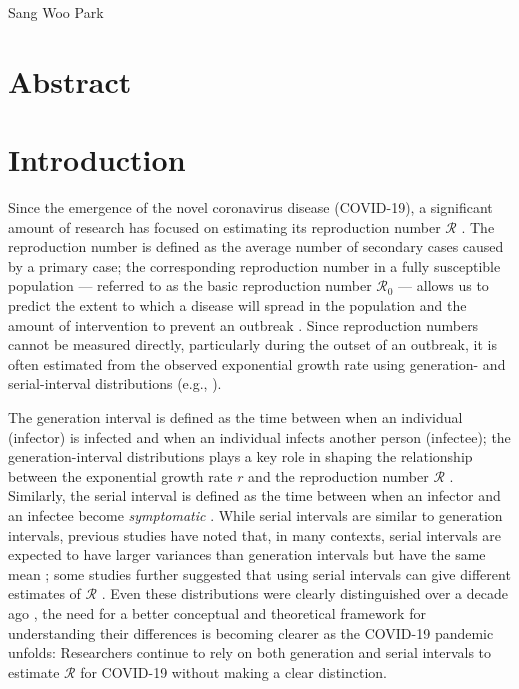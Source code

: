 \documentclass[12pt]{article}
\date{\today}
\begin{document}
\begin{flushleft}{
	\Large
	\textbf{}
}
\newline
Sang Woo Park
\end{flushleft}

\section*{Abstract}

\pagebreak

\section{Introduction}

Since the emergence of the novel coronavirus disease (COVID-19), a significant amount of research has focused on estimating its reproduction number $\mathcal R$ \citep{majumder2020early}.
The reproduction number is defined as the average number of secondary cases caused by a primary case;
the corresponding reproduction number in a fully susceptible population --- referred to as the basic reproduction number $\mathcal R_0$ --- allows us to predict the extent to which a disease will spread in the population and the amount of intervention to prevent an outbreak \citep{anderson1991infectious}.
Since reproduction numbers cannot be measured directly, particularly during the outset of an outbreak, it is often estimated from the observed exponential growth rate using generation- and serial-interval distributions (e.g., \cite{du2020serial, jung2020real, li2020early, zhao2020preliminary}).

The generation interval is defined as the time between when an individual (infector) is infected and when an individual infects another person (infectee);
the generation-interval distributions plays a key role in shaping the relationship between the exponential growth rate $r$ and the reproduction number $\mathcal R$ \citep{wallinga2007generation}.
Similarly, the serial interval is defined as the time between when an infector and an infectee become \emph{symptomatic} \citep{svensson2007note}.
While serial intervals are similar to generation intervals, previous studies have noted that, in many contexts, serial intervals are expected to have larger variances than generation intervals but have the same mean \citep{svensson2007note,klinkenberg2011correlation,champredon2018equivalence};
some studies further suggested that using serial intervals can give different estimates of $\mathcal R$ \citep{britton2019estimation}.
Even these distributions were clearly distinguished over a decade ago \citep{svensson2007note}, 
the need for a better conceptual and theoretical framework for understanding their differences is becoming clearer as the COVID-19 pandemic unfolds:
Researchers continue to rely on both generation and serial intervals to estimate $\mathcal R$ for COVID-19 without making a clear distinction.
\end{document}
